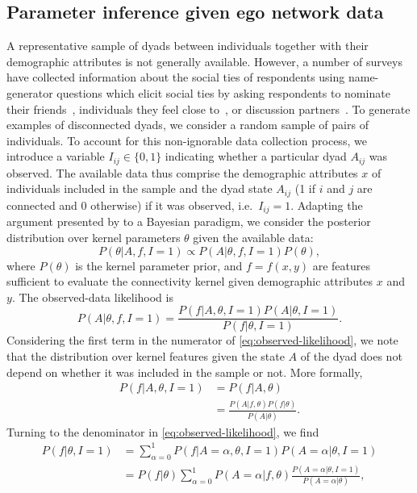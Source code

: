 \documentclass{scrartcl}
\begin{document}
\subsection{Parameter inference given ego network data\label{sec:inference}}

A representative sample of dyads between individuals together with their demographic attributes is not generally available. However, a number of surveys have collected information about the social ties of respondents using name-generator questions which elicit social ties by asking respondents to nominate their friends~\cite{Kalmijn2007}, individuals they feel close to~\cite{Hipp2009}, or discussion partners~\cite{Marsden1987,McPherson2006}. To generate examples of disconnected dyads, we consider a random sample of pairs of individuals. To account for this non-ignorable data collection process, we introduce a variable $I_{ij}\in\{0,1\}$ indicating whether a particular dyad $A_{ij}$ was observed. The available data thus comprise the demographic attributes $x$ of individuals included in the sample and the dyad state $A_{ij}$ (1 if $i$ and $j$ are connected and $0$ otherwise) if it was observed, i.e.\ $I_{ij}=1$. Adapting the argument presented by \textcite{King2001} to a Bayesian paradigm, we consider the posterior distribution over kernel parameters $\theta$ given the available data:
\begin{equation}
    P(\theta|A, f, I=1)\propto P(A|\theta,f,I=1)P(\theta),\label{eq:parameter-posterior}
\end{equation}
where $P(\theta)$ is the kernel parameter prior, and $f=f(x,y)$ are features sufficient to evaluate the connectivity kernel given demographic attributes $x$ and $y$. The observed-data likelihood is
\begin{equation}
    P(A|\theta,f,I=1)=\frac{P(f|A,\theta,I=1)P(A|\theta,I=1)}{P(f|\theta,I=1)}.\label{eq:observed-likelihood}
\end{equation}
Considering the first term in the numerator of \cref{eq:observed-likelihood}, we note that the distribution over kernel features given the state $A$ of the dyad does not depend on whether it was included in the sample or not. More formally,
\begin{align}
    P(f|A,\theta,I=1)&=P(f|A,\theta)\\
    &=\frac{P(A|f,\theta)P(f|\theta)}{P(A|\theta)}.\label{eq:conditional-equivalence}
\end{align}
Turning to the denominator in \cref{eq:observed-likelihood}, we find
\begin{align}
    P(f|\theta,I=1)&=\sum_{\alpha=0}^1 P(f|A=\alpha,\theta,I=1)P(A=\alpha|\theta,I=1)\nonumber\\
    &=P(f|\theta)\sum_{\alpha=0}^1 P(A=\alpha|f,\theta)\frac{P(A=\alpha|\theta,I=1)}{P(A=\alpha|\theta)},\label{eq:likelihood-denominator}
\end{align}
\end{document}
